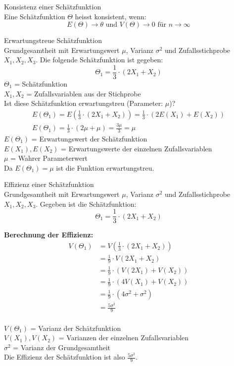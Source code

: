 \begin{definition}{Konsistenz einer Schätzfunktion}\\
Eine Schätzfunktion $\Theta$ heisst konsistent, wenn:
$$
E(\Theta) \rightarrow \theta \text{ und } V(\Theta) \rightarrow 0 \text{ für } n \rightarrow \infty
$$
\end{definition}
\begin{example}{Erwartungstreue Schätzfunktion}\\
Grundgesamtheit mit Erwartungswert $\mu$, Varianz $\sigma^2$ und Zufallsstichprobe $X_1, X_2, X_3$. Die folgende Schätzfunktion ist gegeben:
$$
\Theta_1=\frac{1}{3} \cdot(2X_1+X_2)
$$
$\Theta_1$ = Schätzfunktion\\
$X_1, X_2$ = Zufallsvariablen aus der Stichprobe\\

Ist diese Schätzfunktion erwartungstreu (Parameter: $\mu$)?
$$
\begin{gathered}
E(\Theta_1)=E(\frac{1}{3} \cdot(2X_1+X_2))=\frac{1}{3} \cdot(2E(X_1)+E(X_2)) \\
E(\Theta_1)=\frac{1}{3} \cdot(2\mu+\mu)=\frac{3\mu}{3}=\mu
\end{gathered}
$$
$E(\Theta_1)$ = Erwartungswert der Schätzfunktion\\
$E(X_1), E(X_2)$ = Erwartungswerte der einzelnen Zufallsvariablen\\
$\mu$ = Wahrer Parameterwert\\

Da $E(\Theta_1)=\mu$ ist die Funktion erwartungstreu.
\end{example}
\begin{example}{Effizienz einer Schätzfunktion}\\
Grundgesamtheit mit Erwartungswert $\mu$, Varianz $\sigma^2$ und Zufallsstichprobe $X_1, X_2, X_3$. Gegeben ist die Schätzfunktion:
$$
\Theta_1=\frac{1}{3} \cdot(2X_1+X_2)
$$

\textbf{Berechnung der Effizienz:}
$$
\begin{aligned}
V(\Theta_1) &= V(\frac{1}{3} \cdot(2X_1+X_2)) \\
&= \frac{1}{9} \cdot V(2X_1+X_2) \\
&= \frac{1}{9} \cdot (V(2X_1) + V(X_2)) \\
&= \frac{1}{9} \cdot (4V(X_1) + V(X_2)) \\
&= \frac{1}{9} \cdot (4\sigma^2 + \sigma^2) \\
&= \frac{5\sigma^2}{9}
\end{aligned}
$$
\\
$V(\Theta_1)$ = Varianz der Schätzfunktion\\
$V(X_1), V(X_2)$ = Varianzen der einzelnen Zufallsvariablen\\
$\sigma^2$ = Varianz der Grundgesamtheit\\

Die Effizienz der Schätzfunktion ist also $\frac{5\sigma^2}{9}$.
\end{example}
